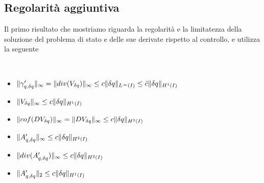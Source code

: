 \subsection{Regolarit\`a aggiuntiva}

Il primo risultato che mostriamo riguarda la regolarità e la limitatezza della soluzione del problema di stato e delle sue derivate rispetto al controllo, e utilizza la seguente
\begin{prop}
	{\scriptsize\ \\}
	\begin{itemize}
	\item $\|\gamma'_{q,{\delta q}}\|_\infty=\|div(V_{\delta q})\|_\infty\leq c\|{\delta q}\|_{L^\infty(I)}\leq \bar{c}\|{\delta q}\|_{H^1(I)}$
	\item $\|V_{\delta q}\|_\infty\leq c\|{\delta q}\|_{H^1(I)}$
	\item $\|cof(DV_{\delta q})\|_\infty=\|DV_{\delta q}\|_\infty\leq c\|{\delta q}\|_{H^2(I)}$
	\item $\|A'_{q,{\delta q}}\|_\infty\leq c\|{\delta q}\|_{H^2(I)}$
	\item $\|div(A'_{q,{\delta q}})\|_\infty\leq c\|{\delta q}\|_{H^2(I)}$
	\item $\|A'_{q,{\delta q}}\|_2\leq c\|{\delta q}\|_{H^1(I)}$
	\end{itemize}
\label{th:come17}
\end{prop}
